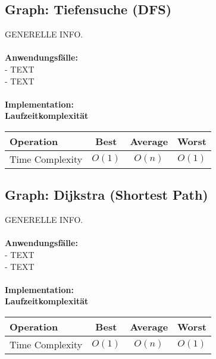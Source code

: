\documentclass[../main.tex]{subfiles}
\begin{document}
	\subsection{Graph: Tiefensuche (DFS)}
	GENERELLE INFO. \\\\
	\textbf{Anwendungsfälle:}\\
	- TEXT\\
	- TEXT\\\\
	\textbf{Implementation:}\\
	 
	\textbf{Laufzeitkomplexität}\\
	\begin{table}[ht]
		\centering
		\begin{tabular}{l *{3}{c}}
			\toprule
			Operation & Best & Average & Worst\\
			\midrule
			Time Complexity & $O(1)$ & $O(n)$ & $O(1)$\\
			\bottomrule
		\end{tabular}
	\end{table}
	\clearpage
	
	\subsection{Graph: Dijkstra (Shortest Path)}
	GENERELLE INFO. \\\\
	\textbf{Anwendungsfälle:}\\
	- TEXT\\
	- TEXT\\\\
	\textbf{Implementation:}\\
	 
	\textbf{Laufzeitkomplexität}\\
	\begin{table}[ht]
		\centering
		\begin{tabular}{l *{3}{c}}
			\toprule
			Operation & Best & Average & Worst\\
			\midrule
			Time Complexity & $O(1)$ & $O(n)$ & $O(1)$\\
			\bottomrule
		\end{tabular}
	\end{table}
	\clearpage
	
\end{document}
